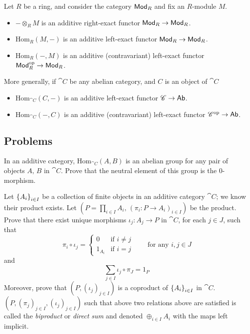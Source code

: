 \vspace*{0.1in}

\begin{example}\label{exactexample}
Let $R$ be a ring, and consider the category $\mathsf{Mod}_R$ and fix an $R$-module $M$. 
\begin{itemize}
\item $- \otimes_R M$ is an additive right-exact functor $\mathsf{Mod}_R \to \mathsf{Mod}_R$.
\item $\mathrm{Hom}_R(M,-)$ is an additive left-exact functor $\mathsf{Mod}_R \to \mathsf{Mod}_R$.
\item $\mathrm{Hom}_R(-,M)$ is an additive (contravariant) left-exact functor $\mathsf{Mod}_R^{\text{op}} \to \mathsf{Mod}_R$.
\end{itemize}
More generally, if $\cat{C}$ be any abelian category, and $C$ is an object of $\cat{C}$
\begin{itemize}
\item $\mathrm{Hom}_{\cat{C}}(C,-)$ is an additive left-exact functor $\mathscr{C} \to \mathsf{Ab}$.
\item $\mathrm{Hom}_{\cat{C}}(-,C)$ is an additive (contravariant) left-exact functor $\mathscr{C}^{\text{op}} \to \mathsf{Ab}$.
\end{itemize}
\end{example}

\vspace*{0.2in}

\subsection{Problems}\vspace{0.1in}

\begin{problem}\label{prob C.1}
In an additive category, $\mathrm{Hom}_{\cat{C}}(A,B)$ is an abelian group for any pair of objects $A,\,B$ in $\cat{C}$. Prove that the neutral element of this group is the $0$-morphism.
\end{problem}

\vspace{0.1in}

\begin{problem}\label{prob C.2}
Let $\left\{A_i\right\}_{i\in I}$ be a collection of finite objects in an additive category $\cat{C}$; we know their product exists. Let $(P = \prod_{i\in I}A_i,\, (\pi_i: P \to A_i)_{i\in I})$ be the product.\\[0.5em]
Prove that there exist unique morphisms $\iota_j: A_j \to P$ in $\cat{C}$, for each $j \in J$, such that
\[\pi_i\circ \iota_j = \begin{cases} 0 & \text{if } i \neq j\\[0.5em] 1_{A_i}  & \text{if } i = j \end{cases}\qquad \text{for any }i,j\in J\]
and
\[\sum_{j\in I}\iota_j\circ \pi_J = 1_P\]
Moreover, prove that $(P,(\iota_j)_{j\in I})$ is a coproduct of $\left\{A_i\right\}_{i\in I}$ in $\cat{C}$.\\[1em]
$(P,(\pi_j)_{j\in I},(\iota_j)_{j\in I})$ such that above two relations above are satisfied is called the \emph{biproduct} or \emph{direct sum} and denoted $\oplus_{i\in I}A_i$ with the maps left implicit.
\end{problem}

